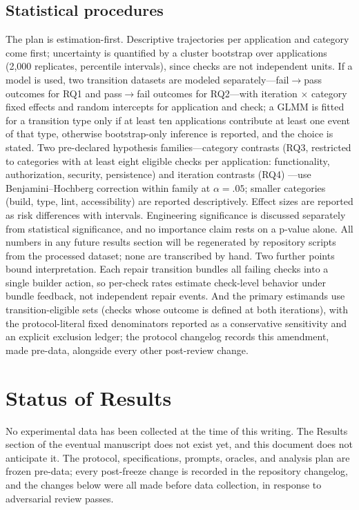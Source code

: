 \subsection{Statistical procedures}

The plan is estimation-first. Descriptive trajectories per application and category
come first; uncertainty is quantified by a cluster bootstrap over applications
(2{,}000 replicates, percentile intervals), since checks are not independent units.
If a model is used, two transition datasets are modeled separately---fail$\to$pass
outcomes for RQ1 and pass$\to$fail outcomes for RQ2---with iteration $\times$
category fixed effects and random intercepts for application and check; a GLMM is
fitted for a transition type only if at least ten applications contribute at least
one event of that type, otherwise bootstrap-only inference is reported, and the
choice is stated. Two pre-declared hypothesis families---category contrasts (RQ3,
restricted to categories with at least eight eligible checks per application:
functionality, authorization, security, persistence) and iteration contrasts (RQ4)
---use Benjamini--Hochberg correction within family at $\alpha=.05$; smaller
categories (build, type, lint, accessibility) are reported descriptively. Effect
sizes are reported as risk differences with intervals. Engineering significance is
discussed separately from statistical significance, and no importance claim rests on
a p-value alone. All numbers in any future results section will be regenerated by
repository scripts from the processed dataset; none are transcribed by hand. Two
further points bound interpretation. Each repair transition bundles all failing
checks into a single builder action, so per-check rates estimate check-level
behavior under bundle feedback, not independent repair events. And the primary
estimands use transition-eligible sets (checks whose outcome is defined at both
iterations), with the protocol-literal fixed denominators reported as a conservative
sensitivity and an explicit exclusion ledger; the protocol changelog records this
amendment, made pre-data, alongside every other post-review change.

\section{Status of Results}

No experimental data has been collected at the time of this writing. The Results
section of the eventual manuscript does not exist yet, and this document does not
anticipate it. The protocol, specifications, prompts, oracles, and analysis plan are
frozen pre-data; every post-freeze change is recorded in the repository changelog,
and the changes below were all made before data collection, in response to
adversarial review passes.


